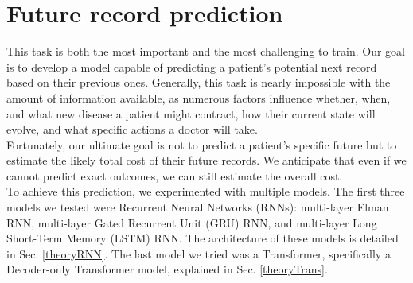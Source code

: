 
\section{Future record prediction}
\label{record_prediction}

This task is both the most important and the most challenging to train. Our goal is to develop a model capable of predicting a patient's potential next record based on their previous ones. Generally, this task is nearly impossible with the amount of information available, as numerous factors influence whether, when, and what new disease a patient might contract, how their current state will evolve, and what specific actions a doctor will take.
\\

Fortunately, our ultimate goal is not to predict a patient's specific future but to estimate the likely total cost of their future records. We anticipate that even if we cannot predict exact outcomes, we can still estimate the overall cost.
\\

To achieve this prediction, we experimented with multiple models. The first three models we tested were Recurrent Neural Networks (RNNs): multi-layer Elman RNN, multi-layer Gated Recurrent Unit (GRU) RNN, and multi-layer Long Short-Term Memory (LSTM) RNN. The architecture of these models is detailed in Sec. \ref{theoryRNN}. The last model we tried was a Transformer, specifically a Decoder-only Transformer model, explained in Sec. \ref{theoryTrans}.

